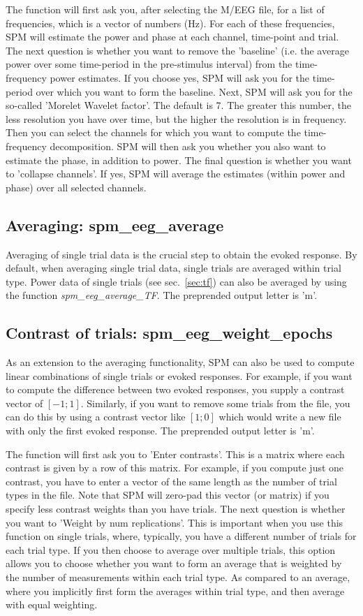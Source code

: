 The function will first ask you, after selecting the M/EEG file, 
for a list of frequencies, which is a vector of numbers (Hz).
 For each of these frequencies, SPM will estimate the power and phase at each 
channel, time-point and trial. The next question is whether you want to remove 
the 'baseline' (i.e. the average power over some time-period in the pre-stimulus interval) 
from the time-frequency power estimates. If you choose yes, SPM will ask you for the time-period 
over which you want to form the baseline. Next, SPM will ask you for the so-called 
'Morelet Wavelet factor'. The default is 7. The greater this number, the less resolution you
 have over time, but the higher the resolution is in frequency. Then you can select the channels 
for which you want to compute the time-frequency decomposition. SPM will then ask you whether 
you also want to estimate the phase, in addition to power. The final question is whether you want
to 'collapse channels'. If yes, SPM will average the estimates (within power and phase) over all selected channels. 

\subsection{Averaging: spm\_eeg\_average}
Averaging of single trial data is the crucial step to obtain the
evoked response. By default, when averaging single trial data, single
trials are averaged within trial type. Power data of single trials
(see sec.~\ref{sec:tf}) can also be averaged by using the function
\textit{spm\_eeg\_average\_TF}. The preprended output letter is 'm'.


\subsection{Contrast of trials: spm\_eeg\_weight\_epochs}
As an extension to the averaging functionality, SPM can also be used
to compute linear combinations of single trials 
or evoked responses. For example, if you want to compute the
difference between two evoked responses, you supply a contrast vector
of $[-1; 1]$. Similarly, if you want to remove some trials from the
file, you can do this by using a contrast vector like $[1; 0]$ which
would write a new file with only the first evoked response. The
preprended output letter is 'm'. 

The function will first ask you to 'Enter contrasts'. 
This is a matrix where each contrast is given by a row of 
this matrix. For example, if you compute just one contrast,
you have to enter a vector of the same length as the number of 
trial types in the file. Note that SPM will zero-pad this vector
 (or matrix) if you specify less contrast weights than you have trials.
 The next question is whether you want to 'Weight by num replications'. 
This is important when you use this function on single trials, where, 
typically, you have a different number of trials for each trial type. 
If you then choose to average over multiple trials, this option allows 
you to choose whether you want to form an average that is weighted 
by the number of measurements within each trial type. As compared 
to an average, where you implicitly first form the averages within 
trial type, and then average with equal weighting.

